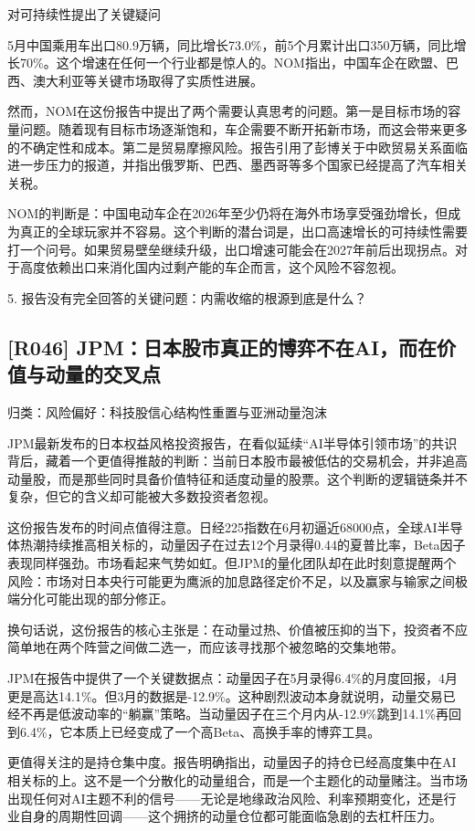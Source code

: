\documentclass[11pt]{ctexart}
\begin{document}
对可持续性提出了关键疑问

5月中国乘用车出口80.9万辆，同比增长73.0\%，前5个月累计出口350万辆，同比增长70\%。这个增速在任何一个行业都是惊人的。NOM指出，中国车企在欧盟、巴西、澳大利亚等关键市场取得了实质性进展。

然而，NOM在这份报告中提出了两个需要认真思考的问题。第一是目标市场的容量问题。随着现有目标市场逐渐饱和，车企需要不断开拓新市场，而这会带来更多的不确定性和成本。第二是贸易摩擦风险。报告引用了彭博关于中欧贸易关系面临进一步压力的报道，并指出俄罗斯、巴西、墨西哥等多个国家已经提高了汽车相关关税。

NOM的判断是：中国电动车企在2026年至少仍将在海外市场享受强劲增长，但成为真正的全球玩家并不容易。这个判断的潜台词是，出口高速增长的可持续性需要打一个问号。如果贸易壁垒继续升级，出口增速可能会在2027年前后出现拐点。对于高度依赖出口来消化国内过剩产能的车企而言，这个风险不容忽视。

5. 报告没有完全回答的关键问题：内需收缩的根源到底是什么？

\subsection{[R046] JPM：日本股市真正的博弈不在AI，而在价值与动量的交叉点}
{\small\color{refgray}归类：风险偏好：科技股信心结构性重置与亚洲动量泡沫}

JPM最新发布的日本权益风格投资报告，在看似延续“AI半导体引领市场”的共识背后，藏着一个更值得推敲的判断：当前日本股市最被低估的交易机会，并非追高动量股，而是那些同时具备价值特征和适度动量的股票。这个判断的逻辑链条并不复杂，但它的含义却可能被大多数投资者忽视。

这份报告发布的时间点值得注意。日经225指数在6月初逼近68000点，全球AI半导体热潮持续推高相关标的，动量因子在过去12个月录得0.44的夏普比率，Beta因子表现同样强劲。市场看起来气势如虹。但JPM的量化团队却在此时刻意提醒两个风险：市场对日本央行可能更为鹰派的加息路径定价不足，以及赢家与输家之间极端分化可能出现的部分修正。

换句话说，这份报告的核心主张是：在动量过热、价值被压抑的当下，投资者不应简单地在两个阵营之间做二选一，而应该寻找那个被忽略的交集地带。

JPM在报告中提供了一个关键数据点：动量因子在5月录得6.4\%的月度回报，4月更是高达14.1\%。但3月的数据是-12.9\%。这种剧烈波动本身就说明，动量交易已经不再是低波动率的“躺赢”策略。当动量因子在三个月内从-12.9\%跳到14.1\%再回到6.4\%，它本质上已经变成了一个高Beta、高换手率的博弈工具。

更值得关注的是持仓集中度。报告明确指出，动量因子的持仓已经高度集中在AI相关标的上。这不是一个分散化的动量组合，而是一个主题化的动量赌注。当市场出现任何对AI主题不利的信号——无论是地缘政治风险、利率预期变化，还是行业自身的周期性回调——这个拥挤的动量仓位都可能面临急剧的去杠杆压力。
\end{document}
